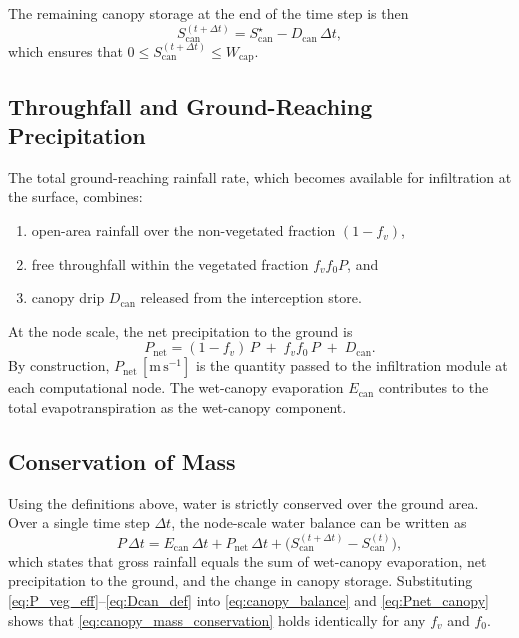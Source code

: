 \documentclass[12pt]{article}
\begin{document}
The remaining canopy storage at the end of the time step is then
\begin{equation}
S_{\mathrm{can}}^{(t+\Delta t)} =
S_{\mathrm{can}}^{\star} - D_{\mathrm{can}}\,\Delta t,
\label{eq:Scan_update}
\end{equation}
which ensures that \(0 \le S_{\mathrm{can}}^{(t+\Delta t)} \le W_{\mathrm{cap}}\).

\subsection{Throughfall and Ground-Reaching Precipitation}

The total ground-reaching rainfall rate, which becomes available for infiltration at the surface, combines:
\begin{enumerate}
  \item open-area rainfall over the non-vegetated fraction \((1-f_v)\),
  \item free throughfall within the vegetated fraction \(f_v f_0 P\), and
  \item canopy drip \(D_{\mathrm{can}}\) released from the interception store.
\end{enumerate}
At the node scale, the net precipitation to the ground is
\begin{equation}
P_{\mathrm{net}} = (1 - f_v)\,P \;+\; f_v f_0\,P \;+\; D_{\mathrm{can}}.
\label{eq:Pnet_canopy}
\end{equation}
By construction, \(P_{\mathrm{net}}\,[\mathrm{m\,s^{-1}}]\) is the quantity passed to the infiltration module at each computational node.
The wet-canopy evaporation \(E_{\mathrm{can}}\) contributes to the total evapotranspiration as the wet-canopy component.

\subsection{Conservation of Mass}

Using the definitions above, water is strictly conserved over the ground area.
Over a single time step \(\Delta t\), the node-scale water balance can be written as
\begin{equation}
P\,\Delta t = E_{\mathrm{can}}\,\Delta t
             + P_{\mathrm{net}}\,\Delta t
             + \bigl(S_{\mathrm{can}}^{(t+\Delta t)} - S_{\mathrm{can}}^{(t)}\bigr),
\label{eq:canopy_mass_conservation}
\end{equation}
which states that gross rainfall equals the sum of wet-canopy evaporation, net precipitation to the ground, and the change in canopy storage.
Substituting \eqref{eq:P_veg_eff}--\eqref{eq:Dcan_def} into \eqref{eq:canopy_balance} and \eqref{eq:Pnet_canopy} shows that \eqref{eq:canopy_mass_conservation} holds identically for any \(f_v\) and \(f_0\).
\end{document}
